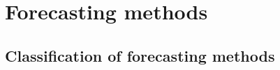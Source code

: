 \section[Forecasting methods]{Forecasting methods}

\subsection{Classification of forecasting methods}

\pagebreak